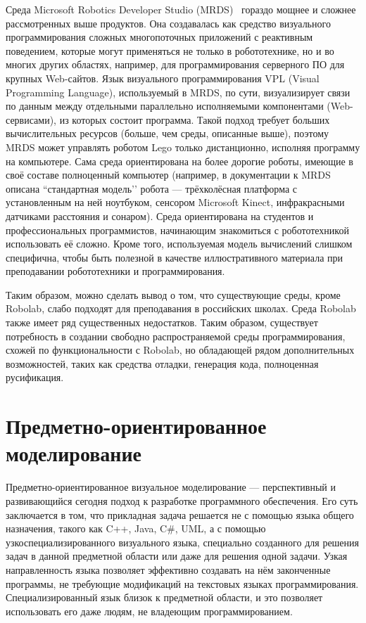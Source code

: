 \documentclass[a4paper]{article}
\begin{document}
Среда Microsoft Robotics Developer Studio (MRDS)~\cite{mrds} гораздо мощнее и сложнее рассмотренных выше продуктов. Она создавалась как средство визуального программирования сложных многопоточных приложений с реактивным поведением, которые могут применяться не только в робототехнике, но и во многих других областях, например, для программирования серверного ПО для крупных Web-сайтов. Язык визуального программирования VPL (Visual Programming Language), используемый в MRDS, по сути, визуализирует связи по данным между отдельными параллельно исполняемыми компонентами (Web-сервисами), из которых состоит программа. Такой подход требует больших вычислительных ресурсов (больше, чем среды, описанные выше), поэтому MRDS может управлять роботом Lego только дистанционно, исполняя программу на компьютере. Сама среда ориентирована на более дорогие роботы, имеющие в своё составе полноценный компьютер (например, в документации к MRDS описана ``стандартная модель’’ робота --- трёхколёсная платформа с установленным на ней ноутбуком, сенсором Microsoft Kinect\textregistered, инфракрасными датчиками расстояния и сонаром). Среда ориентирована на студентов и профессиональных программистов, начинающим знакомиться с робототехникой использовать её сложно. Кроме того, используемая модель вычислений слишком специфична, чтобы быть полезной в качестве иллюстративного материала при преподавании робототехники и программирования.

Таким образом, можно сделать вывод о том, что существующие среды, кроме Robolab, слабо подходят для преподавания в российских школах. Среда Robolab также имеет ряд существенных недостатков. Таким образом, существует потребность в создании свободно распространяемой среды программирования, схожей по функциональности с Robolab, но обладающей рядом дополнительных возможностей, таких как средства отладки, генерация кода, полноценная русификация.

\section{Предметно-ориентированное моделирование}
Предметно-ориентированное визуальное моделирование --- перспективный и развивающийся сегодня подход к разработке программного обеспечения. Его суть заключается в том, что прикладная задача решается не с помощью языка общего назначения, такого как C++, Java, C\#, UML, а с помощью узкоспециализированного визуального языка, специально созданного для решения задач в данной предметной области или даже для решения одной  задачи. Узкая направленность языка позволяет эффективно создавать на нём законченные программы, не требующие модификаций на текстовых языках программирования. Специализированный язык близок к предметной области, и это позволяет использовать его даже людям, не владеющим программированием. 
\end{document}
